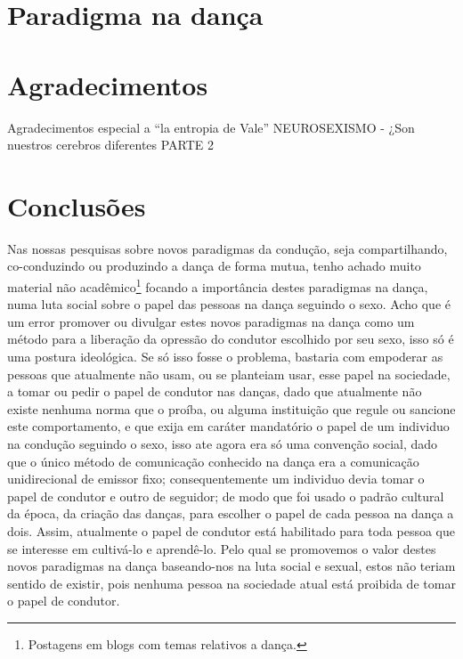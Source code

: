 \documentclass[a4paper,10pt]{article}
\begin{document}
\section{Paradigma na dança}


\section{Agradecimentos}
Agradecimentos especial a ``la entropia de Vale'' 
NEUROSEXISMO - ¿Son nuestros cerebros diferentes PARTE 2
\section{Conclusões}
Nas nossas pesquisas sobre novos paradigmas da condução, seja compartilhando, 
co-conduzindo ou produzindo a dança de forma mutua, 
tenho achado muito material não 
acadêmico\footnote{Postagens em blogs com temas relativos a dança.} 
focando a importância destes paradigmas na dança, 
numa luta social sobre o papel das pessoas na dança seguindo o sexo.
Acho que é um error promover ou divulgar estes novos paradigmas na dança 
como um método para a liberação da opressão do condutor escolhido por seu sexo, 
isso só é uma postura ideológica. 
Se só isso fosse o problema, 
bastaria com empoderar as pessoas que atualmente não usam, 
ou se planteiam usar, esse papel na sociedade, 
a tomar ou pedir o papel de condutor nas danças, 
dado que atualmente não existe nenhuma norma que o proíba,
ou alguma instituição que regule ou sancione este comportamento,
e que exija em caráter mandatório o papel de um individuo na condução seguindo o sexo,
isso ate agora era só uma convenção social, 
dado que o único método de comunicação conhecido na dança era a comunicação unidirecional de emissor fixo;
consequentemente um individuo devia tomar o papel de condutor e outro de seguidor;
de modo que foi usado o padrão cultural da época, da criação das danças, 
para escolher o papel de cada pessoa na dança a dois. 
Assim,  atualmente o papel de condutor está habilitado para toda pessoa que se interesse em 
cultivá-lo e aprendê-lo. 
Pelo qual se promovemos o valor destes novos paradigmas na dança baseando-nos na luta social e sexual, 
estos não teriam sentido de existir, 
pois nenhuma pessoa na sociedade atual está proibida de tomar o papel de condutor.
\end{document}

